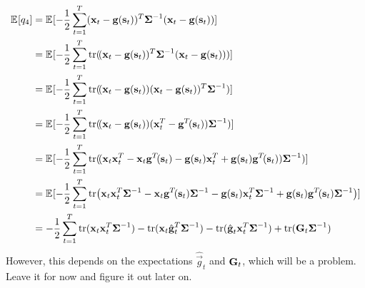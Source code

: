 		\begin{align*}
			\E{q_4}
				&= \E{-\frac{1}{2} \sum_{t = 1}^{T} \paren{\vec{x}_t - \vec{g}\paren{\vec{s}_t}}^T \mat{\Sigma}^{-1} \paren{\vec{x}_t - \vec{g}\paren{\vec{s}_t}}} \\
				&= \E{-\frac{1}{2} \sum_{t = 1}^{T} \tr\paren{\!\paren{\vec{x}_t - \vec{g}\paren{\vec{s}_t}}^T \mat{\Sigma}^{-1} \paren{\vec{x}_t - \vec{g}\paren{\vec{s}_t}}}} \\
				&= \E{-\frac{1}{2} \sum_{t = 1}^{T} \tr\paren{\!\paren{\vec{x}_t - \vec{g}\paren{\vec{s}_t}} \paren{\vec{x}_t - \vec{g}\paren{\vec{s}_t}}^T \mat{\Sigma}^{-1}}} \\
				&= \E{-\frac{1}{2} \sum_{t = 1}^{T} \tr\paren{\!\paren{\vec{x}_t - \vec{g}\paren{\vec{s}_t}} \paren{\vec{x}_t^T - \vec{g}^T\!\paren{\vec{s}_t}} \mat{\Sigma}^{-1}}} \\
				&= \E{-\frac{1}{2} \sum_{t = 1}^{T} \tr\paren{\!\paren{ \vec{x}_t \vec{x}_t^T - \vec{x}_t \vec{g}^T\!\paren{\vec{s}_t} - \vec{g}\paren{\vec{s}_t} \vec{x}_t^T + \vec{g}\paren{\vec{s}_t} \vec{g}^T\!\paren{\vec{s}_t} } \mat{\Sigma}^{-1}}} \\
				&= \E{-\frac{1}{2} \sum_{t = 1}^{T} \tr(\vec{x}_t \vec{x}_t^T \mat{\Sigma}^{-1} - \vec{x}_t \vec{g}^T\!\paren{\vec{s}_t} \mat{\Sigma}^{-1} - \vec{g}\paren{\vec{s}_t} \vec{x}_t^T \mat{\Sigma}^{-1} + \vec{g}\paren{\vec{s}_t} \vec{g}^T\!\paren{\vec{s}_t} \mat{\Sigma}^{-1})} \\
				&= -\frac{1}{2} \sum_{t = 1}^{T} \tr\paren{ \vec{x}_t \vec{x}_t^T \mat{\Sigma}^{-1} } - \tr\paren{ \vec{x}_t \hat{\vec{g}}_t^T \mat{\Sigma}^{-1} } - \tr\paren{ \hat{\vec{g}}_t \vec{x}_t^T \mat{\Sigma}^{-1} } + \tr\paren{ \mat{G}_t \mat{\Sigma}^{-1} }
		\end{align*}
		However, this depends on the expectations \( \hat{\vec{g}}_t \) and \( \boldsymbol{\mathrm{G}}_t \), which will be a problem. Leave it for now and figure it out later on. %
		
